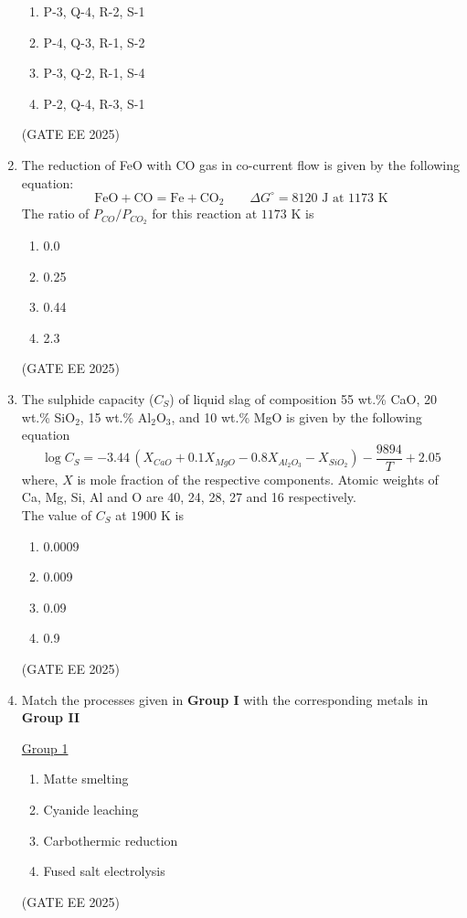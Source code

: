 \documentclass[11pt, letterpaper]{article}
\theoremstyle{remark}
\begin{document}
\begin{enumerate}
\begin{multicols}{2}
\begin{enumerate}
\item P-3, Q-4, R-2, S-1
\item P-4, Q-3, R-1, S-2
\item P-3, Q-2, R-1, S-4
\item P-2, Q-4, R-3, S-1
\end{enumerate}
\end{multicols}
\hfill(GATE EE 2025)

\item The reduction of FeO with CO gas in co-current flow is given by the following equation: \\
\[
    \text{FeO} + \text{CO} = \text{Fe} + \text{CO}_2 \qquad \Delta G^\circ = 8120 \text{ J at 1173 K}
\]
The ratio of $P_{CO}/P_{CO_2}$ for this reaction at $1173$ K is

\begin{multicols}{2}
\begin{enumerate}  
\item 0.0
\item 0.25
\item 0.44
\item 2.3
\end{enumerate}
\end{multicols}
\hfill(GATE EE 2025)

\item The sulphide capacity ($C_S$) of liquid slag of composition 55 wt.\% CaO, 20 wt.\% SiO$_2$, 15 wt.\% Al$_2$O$_3$, and 10 wt.\% MgO is given by the following equation \\
\[
    \log C_S = -3.44 \, (X_{CaO} + 0.1 X_{MgO} - 0.8 X_{Al_2O_3} - X_{SiO_2}) - \frac{9894}{T} + 2.05
\]
where, $X$ is mole fraction of the respective components. Atomic weights of Ca, Mg, Si, Al and O are 40, 24, 28, 27 and 16 respectively. \\
The value of $C_S$ at $1900$ K is
\begin{multicols}{2}
\begin{enumerate}  
\item 0.0009
\item 0.009
\item 0.09
\item 0.9
\end{enumerate}
\end{multicols}
\hfill(GATE EE 2025)

\item Match the processes given in \textbf{Group I} with the corresponding metals in \textbf{Group II}
\begin{multicols}{2}
\underline{Group 1}
\begin{enumerate}[label=(\Alph*), start=16]
\item Matte smelting   
\item Cyanide leaching
\item Carbothermic reduction 
\item Fused salt electrolysis
\end{enumerate}
\hfill(GATE EE 2025)


\end{multicols}
\end{enumerate}
\end{document}
